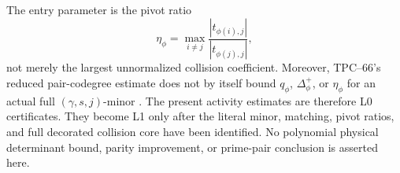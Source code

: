 \begin{remark}
\label{rem:tpc67-cycle-activity-boundary}
The entry parameter is the pivot ratio
\[
 \eta_\phi
 =
 \max_{i\ne j}
 \frac{|t_{\phi(i),j}|}{|t_{\phi(j),j}|},
\]
not merely the largest unnormalized collision coefficient.  Moreover,
TPC--66's reduced pair-codegree estimate does not by itself bound
\(q_\phi\), \(\Delta_\phi^+\), or \(\eta_\phi\) for an actual full
\((\gamma,s,j)\)-minor \citep{WangTPC66}.  The present activity estimates
are therefore L0 certificates.  They become L1 only after the literal
minor, matching, pivot ratios, and full decorated collision core have been
identified.  No polynomial physical determinant bound, parity improvement,
or prime-pair conclusion is asserted here.
\end{remark}
